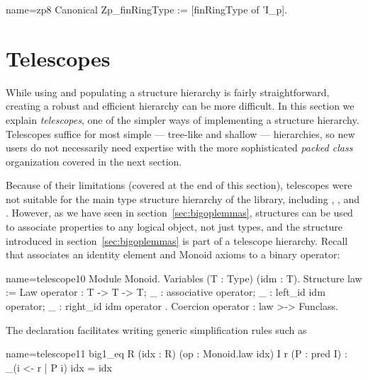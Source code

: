 \begin{coq}{name=zp8}{}
Canonical Zp_finRingType := [finRingType of 'I_p].
\end{coq}


\section{Telescopes}

While using and populating a structure hierarchy is fairly
straightforward, creating a robust and efficient hierarchy can be more
difficult. In this section we explain \emph{telescopes}, one of the
simpler ways of implementing a structure hierarchy.  Telescopes
suffice for most simple --- tree-like and shallow --- hierarchies, so
new users do not necessarily need expertise with the more
sophisticated \emph{packed class} organization covered in the next
section.

Because of their limitations (covered at the end of this section),
telescopes were not suitable for the main type structure hierarchy
of the \mcbMC{} library, including , , 
and . However, as we have seen in
section~\ref{sec:bigoplemmas}, structures can be used to associate
properties to any logical object, not just types, and the
 structure introduced in section~\ref{sec:bigoplemmas} is part
of a telescope hierarchy. Recall that  associates an
identity element and Monoid axioms to a binary operator:

\begin{coq}{name=telescope10}{}
Module Monoid.
Variables (T : Type) (idm : T).
Structure law := Law {
  operator : T -> T -> T;
  _ : associative operator;
  _ : left_id idm operator;
  _ : right_id idm operator
}.
Coercion operator : law >-> Funclass.
\end{coq}

The  declaration facilitates writing generic 
simplification rules such as

\begin{coq}{name=telescope11}{}
  big1_eq R (idx : R) (op : Monoid.law idx) I r (P : pred I) :
    \big[op/idx]_(i <- r | P i) idx = idx
\end{coq}

